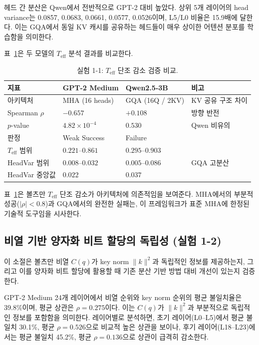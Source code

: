 \documentclass[11pt,a4paper]{article}
\newcommand{\teff}{T_\mathrm{eff}}
\newcommand{\Cq}{C(q)}
\newcommand{\knorm}{\|k\|^2}
\begin{document}
헤드 간 분산은 Qwen에서 전반적으로 GPT-2 대비 높았다. 상위 5개 레이어의 head variance는 0.0857, 0.0683, 0.0661, 0.0577, 0.0526이며, L5/L0 비율은 15.9배에 달한다. 이는 GQA에서 동일 KV 캐시를 공유하는 헤드들이 매우 상이한 어텐션 분포를 학습함을 의미한다.

표~\ref{tab:exp11}은 두 모델의 $\teff$ 분석 결과를 비교한다.

\begin{table}[H]
\centering
\caption{실험 1-1: $\teff$ 단조 감소 검증 비교.}
\label{tab:exp11}
\small
\begin{tabular}{llll}
\toprule
\textbf{지표} & \textbf{GPT-2 Medium} & \textbf{Qwen2.5-3B} & \textbf{비고} \\
\midrule
아키텍처 & MHA (16 heads) & GQA (16Q / 2KV) & KV 공유 구조 차이 \\
Spearman $\rho$ & $-0.657$ & $+0.108$ & 방향 반전 \\
$p$-value & $4.82 \times 10^{-4}$ & $0.530$ & Qwen 비유의 \\
판정 & \textcolor{partial}{Weak Success} & \textcolor{failure}{Failure} & \\
$\teff$ 범위 & $0.221$--$0.861$ & $0.295$--$0.903$ & \\
HeadVar 범위 & $0.008$--$0.032$ & $0.005$--$0.086$ & GQA 고분산 \\
HeadVar 중앙값 & $0.022$ & $\mathbf{0.037}$ & \\
\bottomrule
\end{tabular}
\end{table}

표~\ref{tab:exp11}은 볼츠만 $\teff$ 단조 감소가 아키텍처에 의존적임을 보여준다. MHA에서의 부분적 성공($|\rho| < 0.8$)과 GQA에서의 완전한 실패는, 이 프레임워크가 표준 MHA에 한정된 기술적 도구임을 시사한다.

\subsection{비열 기반 양자화 비트 할당의 독립성 (실험 1-2)}

이 소절은 볼츠만 비열 $\Cq$가 key norm $\knorm$과 독립적인 정보를 제공하는지, 그리고 이를 양자화 비트 할당에 활용할 때 기존 분산 기반 방법 대비 개선이 있는지 검증한다.

GPT-2 Medium 24개 레이어에서 비열 순위와 key norm 순위의 평균 불일치율은 39.8\%이며, 평균 상관은 $\rho = 0.275$이다. 이는 $\Cq$가 $\knorm$과 부분적으로 독립적인 정보를 포함함을 의미한다. 레이어별로 분석하면, 초기 레이어(L0--L5)에서 평균 불일치 30.1\%, 평균 $\rho = 0.526$으로 비교적 높은 상관을 보이나, 후기 레이어(L18--L23)에서는 평균 불일치 45.2\%, 평균 $\rho = 0.136$으로 상관이 급격히 감소한다.
\end{document}
